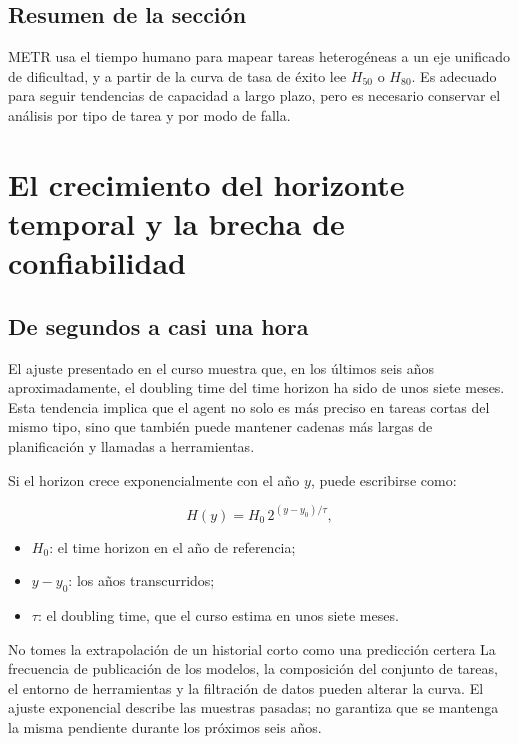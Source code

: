 \documentclass[a4paper]{article}
\begin{document}
\subsection{Resumen de la sección}

METR usa el tiempo humano para mapear tareas heterogéneas a un eje unificado de dificultad, y a partir de la curva de tasa de éxito lee $H_{50}$ o $H_{80}$. Es adecuado para seguir tendencias de capacidad a largo plazo, pero es necesario conservar el análisis por tipo de tarea y por modo de falla.
\section{El crecimiento del horizonte temporal y la brecha de confiabilidad}

\subsection{De segundos a casi una hora}


El ajuste presentado en el curso muestra que, en los últimos seis años aproximadamente, el doubling time del time horizon ha sido de unos siete meses. Esta tendencia implica que el agent no solo es más preciso en tareas cortas del mismo tipo, sino que también puede mantener cadenas más largas de planificación y llamadas a herramientas.

Si el horizon crece exponencialmente con el año $y$, puede escribirse como:

$$
H(y)=H_0\,2^{(y-y_0)/\tau},
$$

\begin{itemize}
    \item $H_0$: el time horizon en el año de referencia;
    \item $y-y_0$: los años transcurridos;
    \item $\tau$: el doubling time, que el curso estima en unos siete meses.
\end{itemize}

\begin{warningbox}{No tomes la extrapolación de un historial corto como una predicción certera}
La frecuencia de publicación de los modelos, la composición del conjunto de tareas, el entorno de herramientas y la filtración de datos pueden alterar la curva. El ajuste exponencial describe las muestras pasadas; no garantiza que se mantenga la misma pendiente durante los próximos seis años.
\end{warningbox}
\end{document}

